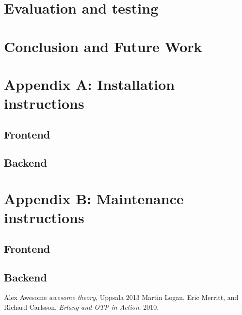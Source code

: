 \documentclass[11pt]{report}
\begin{document}









\chapter{Evaluation and testing}



\chapter{Conclusion and Future Work}


\chapter{Appendix A: Installation instructions}
\section {Frontend}

\section {Backend}

\chapter {Appendix B: Maintenance instructions}

\section{Frontend}

\section{Backend}


\begin{thebibliography}{99}
 Alex Awesome \textsl{awesome theory}, Uppsala 2013
 Martin Logan, Eric Merritt, and Richard Carlsson. \textsl{Erlang and OTP in Action}. 2010.

\end{thebibliography}
\end{document}
